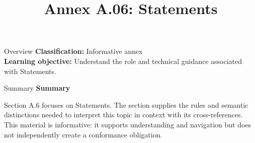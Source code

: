 \documentclass[10pt,letterpaper]{article}
\title{Annex A.06: Statements}
\author{}
\date{}
\begin{document}
\maketitle
\begin{CornellOverviewBox}{Overview}
\textbf{Classification:} Informative annex\\[2pt]
\textbf{Learning objective:} Understand the role and technical guidance associated with Statements.
\end{CornellOverviewBox}\begin{CornellSummaryBox}{Summary}
{\sffamily\bfseries\color{Accent} Summary}\par\vspace{3pt}Section A.6 focuses on Statements. The section supplies the rules and semantic distinctions needed to interpret this topic in context with its cross-references. This material is informative: it supports understanding and navigation but does not independently create a conformance obligation.
\end{CornellSummaryBox}
\end{document}

